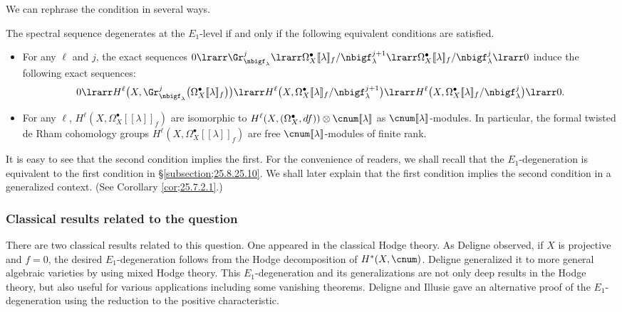 \documentclass[a4,10pt]{article}
\begin{document}
We can rephrase the condition in several ways.
\begin{lem}
\label{lem;25.6.29.20}
The spectral sequence degenerates at the $E_1$-level
if and only if the following equivalent conditions are satisfied.
\begin{itemize}
 \item For any $\ell$ and $j$,
      the exact sequences
       $0\lrarr
\Gr_{\nbigf_{\lambda}}^j\lrarr
\Omega_X^{\bullet}[\![\lambda]\!]_f/\nbigf_{\lambda}^{j+1}\lrarr
       \Omega_X^{\bullet}[\![\lambda]\!]_f/\nbigf_{\lambda}^{j}\lrarr 0$
       induce the following exact sequences:
\[
 0\lrarr
 H^{\ell}\bigl(
 X,\Gr_{\nbigf_{\lambda}}^j\bigl(\Omega_X^{\bullet}[\![\lambda]\!]_f\bigr)
 \bigr)
 \lrarr
  H^{\ell}\bigl(
 X,\Omega_X^{\bullet}[\![\lambda]\!]_f/\nbigf_{\lambda}^{j+1}
 \bigr)
 \lrarr \\
 H^{\ell}\bigl(
 X,\Omega^{\bullet}_X[\![\lambda]\!]_f/\nbigf_{\lambda}^{j}
 \bigr)
 \lrarr 0.
\]      
 \item 
 For any $\ell$,
  $H^{\ell}(X,\Omega^{\bullet}_X[\![\lambda]\!]_f)$
      are isomorphic to
      $H^{\ell}(X,(\Omega^{\bullet}_X,df))\otimes\cnum[\![\lambda]\!]$
      as $\cnum[\![\lambda]\!]$-modules.
In particular,
the formal twisted de Rham cohomology groups
$H^{\ell}(X,\Omega^{\bullet}_X[\![\lambda]\!]_f)$
are free
$\cnum[\![\lambda]\!]$-modules
       of finite rank.
\end{itemize}
\end{lem}

\begin{rem}
It is easy to see that the second condition implies
the first.
For the convenience of readers,
we shall recall that the $E_1$-degeneration
is equivalent to the first condition
in {\rm\S\ref{subsection;25.8.25.10}}.
We shall later explain that
the first condition implies the second condition
in a generalized context. 
(See Corollary {\rm\ref{cor;25.7.2.1}}.)
\end{rem}

\subsubsection{Classical results related to the question}

There are two classical results
related to this question.
One appeared in the classical Hodge theory.
As Deligne observed,
if $X$ is projective and $f=0$,
the desired $E_1$-degeneration
follows from the Hodge decomposition of $H^{\ast}(X,\cnum)$.
Deligne generalized it to
more general algebraic varieties by using mixed Hodge theory.
This $E_1$-degeneration and its generalizations
are not only deep results in the Hodge theory,
but also useful for various applications
including some vanishing theorems.
Deligne and Illusie gave
an alternative proof of the $E_1$-degeneration
using the reduction to the positive characteristic.
\end{document}
